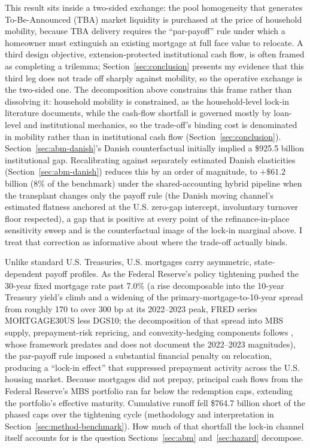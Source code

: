\documentclass[12pt]{article}
\begin{document}
This result sits inside a two-sided exchange: the pool homogeneity that generates To-Be-Announced (TBA) market liquidity is purchased at the price of household mobility, because TBA delivery requires the ``par-payoff'' rule under which a homeowner must extinguish an existing mortgage at full face value to relocate. A third design objective, extension-protected institutional cash flow, is often framed as completing a trilemma; Section~\ref{sec:conclusion} presents my evidence that this third leg does not trade off sharply against mobility, so the operative exchange is the two-sided one. The decomposition above constrains this frame rather than dissolving it: household mobility is constrained, as the household-level lock-in literature documents, while the cash-flow shortfall is governed mostly by loan-level and institutional mechanics, so the trade-off's binding cost is denominated in mobility rather than in institutional cash flow (Section~\ref{sec:conclusion}). Section~\ref{sec:abm-danish}'s Danish counterfactual initially implied a \$925.5 billion institutional gap. Recalibrating against separately estimated Danish elasticities (Section~\ref{sec:abm-danish}) reduces this by an order of magnitude, to $+\$61.2$ billion (8\% of the benchmark) under the shared-accounting hybrid pipeline when the transplant changes only the payoff rule (the Danish moving channel's estimated flatness anchored at the U.S. zero-gap intercept, involuntary turnover floor respected), a gap that is positive at every point of the refinance-in-place sensitivity sweep and is the counterfactual image of the lock-in marginal above. I treat that correction as informative about where the trade-off actually binds.

Unlike standard U.S. Treasuries, U.S. mortgages carry asymmetric, state-dependent payoff profiles. As the Federal Reserve's policy tightening pushed the 30-year fixed mortgage rate past 7.0\% (a rise decomposable into the 10-year Treasury yield's climb and a widening of the primary-mortgage-to-10-year spread from roughly 170 to over 300 bp at its 2022--2023 peak, FRED series MORTGAGE30US less DGS10; the decomposition of that spread into MBS supply, prepayment-risk repricing, and convexity-hedging components follows \citet{boyarchenko2019}, whose framework predates and does not document the 2022--2023 magnitudes), the par-payoff rule imposed a substantial financial penalty on relocation, producing a ``lock-in effect'' that suppressed prepayment activity across the U.S. housing market. Because mortgages did not prepay, principal cash flows from the Federal Reserve's MBS portfolio ran far below the redemption caps, extending the portfolio's effective maturity. Cumulative runoff fell \$764.7 billion short of the phased caps over the tightening cycle (methodology and interpretation in Section~\ref{sec:method-benchmark}). How much of that shortfall the lock-in channel itself accounts for is the question Sections~\ref{sec:abm} and~\ref{sec:hazard} decompose.
\end{document}

